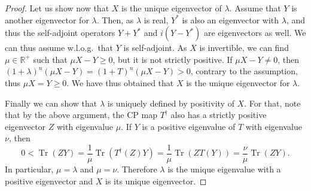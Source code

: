 \documentclass{article}
\newcommand{\tr}{\operatorname{Tr}}
\begin{document}
\begin{proof}
  Let us show now that $X$ is the unique eigenvector of $\lambda$. Assume that $Y$ is another eigenvector for $\lambda$. Then, as $\lambda$ is real, $Y^*$ is also an eigenvector with $\lambda$, and thus the self-adjoint operators $Y+Y^*$ and $i(Y-Y^*)$ are eigenvectors as well. We can thus assume w.l.o.g.\ that $Y$ is self-adjoint. As $X$ is invertible, we can find $\mu\in \mathbb{R}^+$ such that $\mu X-Y \geq 0$, but it is not strictly positive. If $\mu X-Y\neq 0$, then $(1+\lambda)^n(\mu X - Y) = (1+T)^n(\mu X - Y)> 0$, contrary to the assumption, thus $\mu X = Y \geq 0$. We have thus obtained that $X$ is the unique eigenvector for $\lambda$.
  
  Finally we can show that $\lambda$ is uniquely defined by positivity of $X$. For that, note that by the above argument, the CP map $T^\dagger$ also has a strictly positive eigenvector $Z$ with eigenvalue $\mu$. If $Y$ is a positive eigenvalue of $T$ with eigenvalue $\nu$, then
  \begin{equation*}
    0< \tr(ZY) = \frac{1}{\mu} \tr(T^\dagger(Z)Y) = \frac{1}{\mu} \tr(Z T(Y)) = \frac{\nu}{\mu} \tr(ZY).
  \end{equation*}
  In particular, $\mu = \lambda$ and $\mu=\nu$. Therefore $\lambda$ is the unique eigenvalue with a positive eigenvector and $X$ is its unique eigenvector.
\end{proof}
\end{document}
